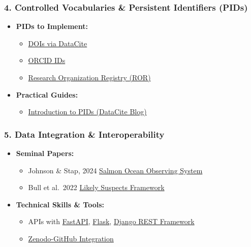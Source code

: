 \documentclass[
  letterpaper,
  DIV=11,
  numbers=noendperiod]{scrartcl}
\providecommand{\tightlist}{%
  \setlength{\itemsep}{0pt}\setlength{\parskip}{0pt}}\usepackage{longtable,booktabs,array}
\begin{document}
\subsubsection{4. Controlled Vocabularies \& Persistent Identifiers
(PIDs)}\label{controlled-vocabularies-persistent-identifiers-pids}

\begin{itemize}
\tightlist
\item
  \textbf{PIDs to Implement:}

  \begin{itemize}
  \tightlist
  \item
    \href{https://datacite.org}{DOIs via DataCite}
  \item
    \href{https://orcid.org}{ORCID IDs}
  \item
    \href{https://ror.org}{Research Organization Registry (ROR)}
  \end{itemize}
\item
  \textbf{Practical Guides:}

  \begin{itemize}
  \tightlist
  \item
    \href{https://blog.datacite.org/}{Introduction to PIDs (DataCite
    Blog)}
  \end{itemize}
\end{itemize}

\subsubsection{5. Data Integration \&
Interoperability}\label{data-integration-interoperability}

\begin{itemize}
\tightlist
\item
  \textbf{Seminal Papers:}

  \begin{itemize}
  \tightlist
  \item
    Johnson \& Stap, 2024
    \href{https://doi.org/10.23849/npafcb7/6a4ddpde4}{Salmon Ocean
    Observing System}
  \item
    Bull et al.~2022
    \href{https://doi.org/10.1093/icesjms/fsac099}{Likely Suspects
    Framework}
  \end{itemize}
\item
  \textbf{Technical Skills \& Tools:}

  \begin{itemize}
  \tightlist
  \item
    APIs with \href{https://fastapi.tiangolo.com}{FastAPI},
    \href{https://flask.palletsprojects.com}{Flask},
    \href{https://www.django-rest-framework.org}{Django REST Framework}
  \item
    \href{https://guides.github.com/activities/citable-code/}{Zenodo-GitHub
    Integration}
  \end{itemize}
\end{itemize}
\end{document}
